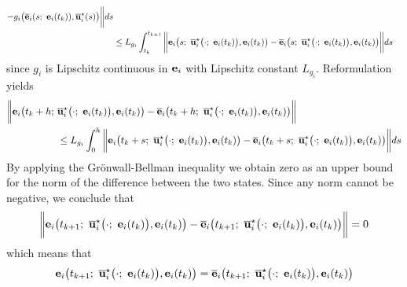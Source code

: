 \begin{gg_box}
\begin{align}
  - g_i\big(\overline{\vect{e}}_i(s;\ \vect{e}_i(t_k)), \overline{\vect{u}}_i^{\star}(s)\big) \bigg\| ds\\
  &\leq L_{g_i}\int_{t_k}^{t_{k+1}} \bigg\|
    \vect{e}_i\big(s;\ \overline{\vect{u}}_i^{\star}\big(\cdot;\ \vect{e}_i(t_k)\big), \vect{e}_i(t_k)\big)
    -\overline{\vect{e}}_i\big(s;\ \overline{\vect{u}}_i^{\star}\big(\cdot;\ \vect{e}_i(t_k)\big), \vect{e}_i(t_k)\big) \bigg\| ds
\end{align}
since $g_i$ is Lipschitz continuous in $\bm{\mathbf{e}}_i$ with Lipschitz constant
$L_{g_i}$. Reformulation yields
\begin{align}
  \bigg\|\vect{e}_i\big(t_k+h;\ &\overline{\vect{u}}_i^{\star}\big(\cdot;\ \vect{e}_i(t_k)\big), \vect{e}_i(t_k)\big)
    -\overline{\vect{e}}_i\big(t_k+h;\ \overline{\vect{u}}_i^{\star}\big(\cdot;\ \vect{e}_i(t_k)\big), \vect{e}_i(t_k)\big) \bigg\| \\
  &\leq L_{g_i}\int_{0}^{h} \bigg\|
    \vect{e}_i\big(t_k + s;\ \overline{\vect{u}}_i^{\star}\big(\cdot;\ \vect{e}_i(t_k)\big), \vect{e}_i(t_k)\big)
    -\overline{\vect{e}}_i\big(t_k + s;\ \overline{\vect{u}}_i^{\star}\big(\cdot;\ \vect{e}_i(t_k)\big), \vect{e}_i(t_k)\big) \bigg\| ds
\end{align}
By applying the Gr\"{o}nwall-Bellman inequality we obtain zero as an
upper bound for the norm of the difference between the two states. Since
any norm cannot be negative, we conclude that
\begin{align}
  \bigg\|\vect{e}_i\big(t_{k+1};\ \overline{\vect{u}}_i^{\star}\big(\cdot;\ \vect{e}_i(t_k)\big), \vect{e}_i(t_k)\big)
    -\overline{\vect{e}}_i\big(t_{k+1};\ \overline{\vect{u}}_i^{\star}\big(\cdot;\ \vect{e}_i(t_k)\big), \vect{e}_i(t_k)\big) \bigg\| = 0
\end{align}
which means that
\begin{align}
  \vect{e}_i\big(t_{k+1};\ \overline{\vect{u}}_i^{\star}\big(\cdot;\ \vect{e}_i(t_k)\big), \vect{e}_i(t_k)\big)
    =\overline{\vect{e}}_i\big(t_{k+1};\ \overline{\vect{u}}_i^{\star}\big(\cdot;\ \vect{e}_i(t_k)\big), \vect{e}_i(t_k)\big)
\end{align}


\end{gg_box}

